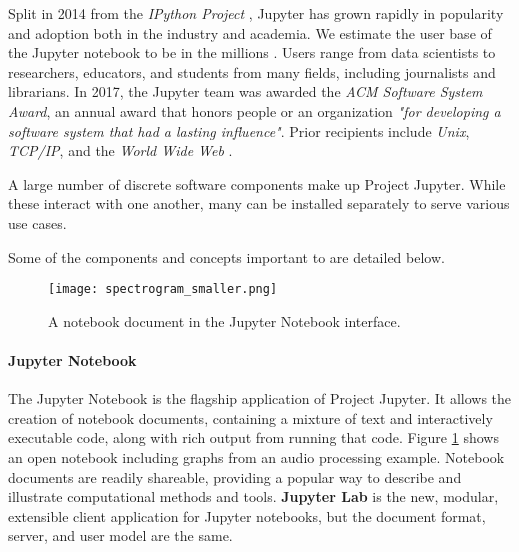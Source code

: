Split in 2014 from the \emph{IPython Project} \cite{IPython}, Jupyter has grown rapidly in
popularity and adoption both in the industry and academia. We estimate the user
base of the Jupyter notebook to be in the millions \cite{jupyter-grant}. Users range from data
scientists to researchers, educators, and students from many fields,
including journalists and librarians. In 2017, the Jupyter
team was awarded the \emph{ACM Software System Award}, an annual award that
honors people or an organization \emph{"for developing a software system that had a
lasting influence"}. Prior recipients include \emph{Unix}, \emph{TCP/IP}, and
the \emph{World Wide Web} \cite{acm-award}.

A large number of discrete software components make up Project Jupyter.
While these interact with one another, many can be installed separately
to serve various use cases.


Some of the components and concepts important to \TheProject are detailed below.

\begin{figure}[ht]\centering
  \centering
  \texttt{[image: spectrogram\_smaller.png]}
  \caption{A notebook document in the Jupyter Notebook interface.}\label{fig:notebook-screenshot}
\end{figure}

\paragraph{Jupyter Notebook}\label{sec:jupyter-notebook} The Jupyter Notebook is
the flagship application of Project Jupyter. 
It allows the creation of notebook documents, containing a mixture of text and
interactively executable code, along with rich output from running that code.
Figure \ref{fig:notebook-screenshot} shows an open notebook including graphs
from an audio processing example. Notebook documents are readily shareable,
providing a popular way to describe and illustrate computational methods and
tools.  \textbf{Jupyter Lab} is the new, modular, extensible
client application for Jupyter notebooks, but the document format, server, and
user model are the same.


